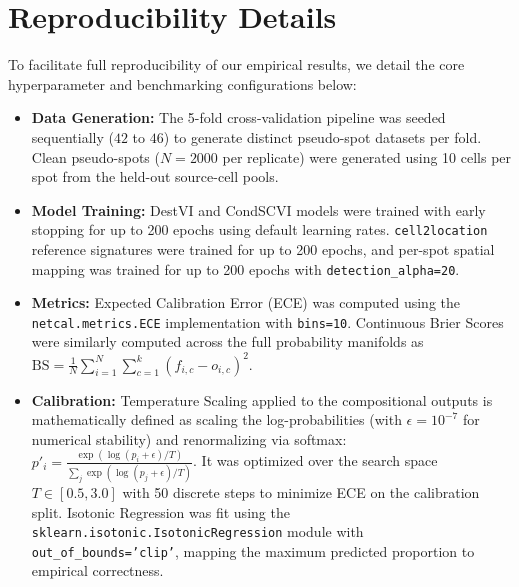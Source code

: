 \documentclass{jmlr} %
\begin{document}


\appendix
\section{Reproducibility Details}
\label{app:reproducibility}
To facilitate full reproducibility of our empirical results, we detail the core hyperparameter and benchmarking configurations below:
\begin{itemize}
    \item \textbf{Data Generation:} The 5-fold cross-validation pipeline was seeded sequentially ($42$ to $46$) to generate distinct pseudo-spot datasets per fold. Clean pseudo-spots ($N=2000$ per replicate) were generated using 10 cells per spot from the held-out source-cell pools.
    \item \textbf{Model Training:} DestVI and CondSCVI models were trained with early stopping for up to 200 epochs using default learning rates. \texttt{cell2location} reference signatures were trained for up to 200 epochs, and per-spot spatial mapping was trained for up to 200 epochs with \texttt{detection\_alpha=20}.
    \item \textbf{Metrics:} Expected Calibration Error (ECE) was computed using the \texttt{netcal.metrics.ECE} implementation with \texttt{bins=10}. Continuous Brier Scores were similarly computed across the full probability manifolds as $\text{BS} = \frac{1}{N} \sum_{i=1}^{N} \sum_{c=1}^{k} (f_{i,c} - o_{i,c})^2$.
    \item \textbf{Calibration:} Temperature Scaling applied to the compositional outputs is mathematically defined as scaling the log-probabilities (with $\epsilon=10^{-7}$ for numerical stability) and renormalizing via softmax: $p'_i = \frac{\exp(\log(p_i + \epsilon) / T)}{\sum_j \exp(\log(p_j + \epsilon) / T)}$. It was optimized over the search space $T \in [0.5, 3.0]$ with 50 discrete steps to minimize ECE on the calibration split. Isotonic Regression was fit using the \texttt{sklearn.isotonic.IsotonicRegression} module with \texttt{out\_of\_bounds='clip'}, mapping the maximum predicted proportion to empirical correctness.
\end{itemize}
\end{document}
